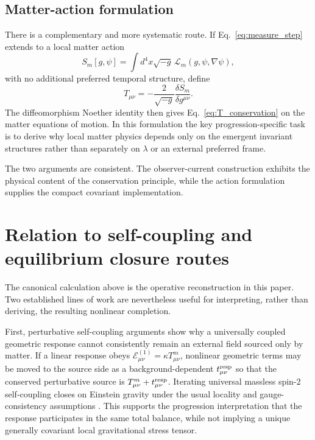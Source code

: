\documentclass[11pt]{article}
\begin{document}
\subsection{Matter-action formulation}

There is a complementary and more systematic route. If Eq.~\eqref{eq:measure_step} extends to a local matter action
\begin{equation}
    \boxed{
    S_m[g,\psi]
    =\int d^4x\sqrt{-g}\,\mathcal L_m(g,\psi,\nabla\psi),}
    \label{eq:matter_action}
\end{equation}
with no additional preferred temporal structure, define
\begin{equation}
    T_{\mu\nu}
    =-\frac{2}{\sqrt{-g}}
      \frac{\delta S_m}{\delta g^{\mu\nu}}.
\end{equation}
The diffeomorphism Noether identity then gives Eq.~\eqref{eq:T_conservation} on the matter equations of motion. In this formulation the key progression-specific task is to derive why local matter physics depends only on the emergent invariant structures rather than separately on $\lambda$ or an external preferred frame.

The two arguments are consistent. The observer-current construction exhibits the physical content of the conservation principle, while the action formulation supplies the compact covariant implementation.

\section{Relation to self-coupling and equilibrium closure routes}

The canonical calculation above is the operative reconstruction in this paper. Two established lines of work are nevertheless useful for interpreting, rather than deriving, the resulting nonlinear completion.

First, perturbative self-coupling arguments show why a universally coupled geometric response cannot consistently remain an external field sourced only by matter. If a linear response obeys $\mathcal E^{(1)}_{\mu\nu}=\kappa T^m_{\mu\nu}$, nonlinear geometric terms may be moved to the source side as a background-dependent $t^{\rm resp}_{\mu\nu}$ so that the conserved perturbative source is $T^m_{\mu\nu}+t^{\rm resp}_{\mu\nu}$. Iterating universal massless spin-2 self-coupling closes on Einstein gravity under the usual locality and gauge-consistency assumptions \cite{Deser1970,Deser2010}. This supports the progression interpretation that the response participates in the same total balance, while not implying a unique generally covariant local gravitational stress tensor.
\end{document}
